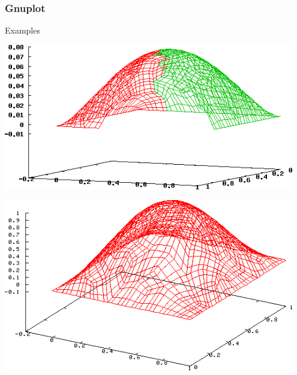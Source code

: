 \documentclass{beamer}
\begin{document}

\begin{frame}

    \frametitle{Gnuplot}

    \begin{block}{Examples}

        \centering

        \begin{minipage}{0.5\textwidth}
            \centering
            \includegraphics[width=0.95\textwidth]{images/img1}
        \end{minipage}%
        \begin{minipage}{0.5\textwidth}
            \centering
            \includegraphics[width=0.95\textwidth]{images/soluzione2}
        \end{minipage}

    \end{block}

\end{frame}

\end{document}
